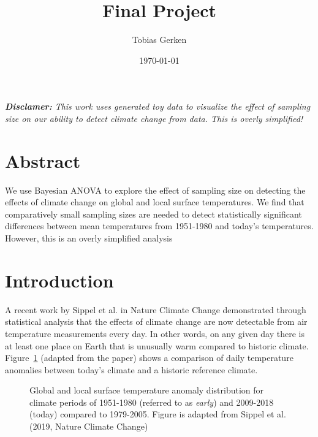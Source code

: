 \documentclass[letter, pt=10]{scrartcl}
\title{Final Project}
\author{Tobias Gerken}
\date{\today}
\begin{document}
\maketitle

\emph{\textbf{Disclamer:} This work uses generated toy data to visualize the effect of sampling size on our ability to detect climate change from data. This is overly simplified! }

\section{Abstract}
We use Bayesian ANOVA to explore the effect of sampling size on detecting the effects of climate change on global and local surface temperatures. We find that comparatively small sampling sizes are needed to detect statistically significant differences between mean temperatures from 1951-1980 and today's temperatures. However, this is an overly simplified analysis 


\section{Introduction}
A recent work by Sippel et al. in Nature Climate Change \cite{Sippel} demonstrated through statistical analysis that the effects of climate change are now detectable from  air temperature measurements every day. In other words, on any given day there is at least one place on Earth that is unusually warm compared to historic climate. 
Figure~\ref{fig:hist} (adapted from the paper) shows a comparison of daily temperature anomalies between today's climate and a historic reference climate.

\begin{figure}[h!]
    \centering
    \qquad
    \caption{Global and local surface temperature anomaly distribution for climate periods of 1951-1980 (referred to as \emph{early}) and 2009-2018 (today) compared to 1979-2005. Figure is adapted from Sippel et al. (2019, Nature Climate Change)}%
    \label{fig:hist}%
\end{figure}
\end{document}
